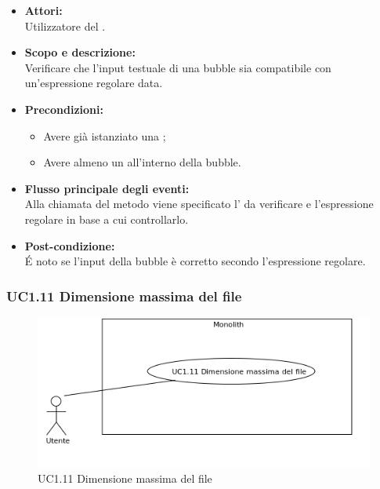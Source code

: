 \begin{itemize}
	\item \textbf{Attori:}
	\\Utilizzatore del .
	\item \textbf{Scopo e descrizione:} 
	\\Verificare che l’input testuale di una bubble sia compatibile con un'espressione regolare data.
	\item \textbf{Precondizioni:}
	\begin{itemize}
		\item Avere già istanziato una ;
		\item Avere almeno un  all'interno della bubble.
	\end{itemize}
	\item \textbf{Flusso principale degli eventi:}
	\\Alla chiamata del metodo viene specificato l’ da verificare e l'espressione regolare in base a cui controllarlo.
	\item \textbf{Post-condizione:}
	\\É noto se l’input della bubble è corretto secondo l’espressione regolare.
\end{itemize}

\subsubsection{UC1.11 Dimensione massima del file} \label{UC1.11}

\begin{figure}[H]
	\centering
	\includegraphics[width=15cm]{../../documenti/AnalisiDeiRequisiti/Diagrammi_img/uc1_11.png}
	\caption{UC1.11 Dimensione massima del file}
\end{figure}

